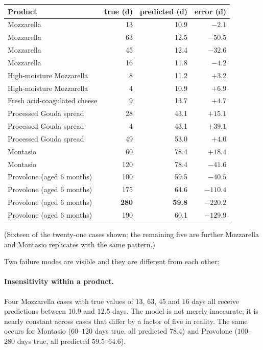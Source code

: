 \begin{center}\small
\begin{tabular}{lrrr}
\toprule
Product & true (d) & predicted (d) & error (d) \\
\midrule
Mozzarella & 13 & 10.9 & $-2.1$ \\
Mozzarella & 63 & 12.5 & $-50.5$ \\
Mozzarella & 45 & 12.4 & $-32.6$ \\
Mozzarella & 16 & 11.8 & $-4.2$ \\
High-moisture Mozzarella & 8 & 11.2 & $+3.2$ \\
High-moisture Mozzarella & 4 & 10.9 & $+6.9$ \\
Fresh acid-coagulated cheese & 9 & 13.7 & $+4.7$ \\
Processed Gouda spread & 28 & 43.1 & $+15.1$ \\
Processed Gouda spread & 4 & 43.1 & $+39.1$ \\
Processed Gouda spread & 49 & 53.0 & $+4.0$ \\
Montasio & 60 & 78.4 & $+18.4$ \\
Montasio & 120 & 78.4 & $-41.6$ \\
Provolone (aged 6 months) & 100 & 59.5 & $-40.5$ \\
Provolone (aged 6 months) & 175 & 64.6 & $-110.4$ \\
Provolone (aged 6 months) & \textbf{280} & \textbf{59.8} & $\mathbf{-220.2}$ \\
Provolone (aged 6 months) & 190 & 60.1 & $-129.9$ \\
\bottomrule
\end{tabular}
\end{center}

\noindent (Sixteen of the twenty-one cases shown; the remaining five are
further Mozzarella and Montasio replicates with the same pattern.)

Two failure modes are visible and they are different from each other:

\paragraph{Insensitivity within a product.} Four Mozzarella cases with true
values of $13$, $63$, $45$ and $16$ days all receive predictions between
$10.9$ and $12.5$ days. The model is not merely inaccurate; it is nearly
constant across cases that differ by a factor of five in reality. The same
occurs for Montasio ($60$--$120$ days true, all predicted $78.4$) and
Provolone ($100$--$280$ days true, all predicted $59.5$--$64.6$).

